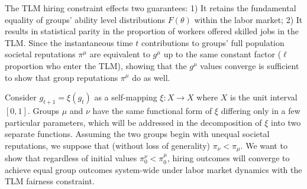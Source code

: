 \documentclass[sigconf]{acmart}
\theoremstyle{definition}
\begin{document}


The TLM hiring constraint effects two guarantees: 1) It retains the fundamental equality of groups' ability level distributions $F(\theta)$ within the labor market; 2) It results in statistical parity in the proportion of workers offered skilled jobs in the TLM. Since the instantaneous time $t$ contributions to groups' full population societal reputations $\pi^\mu$ are equivalent to $g^\mu$ up to the same constant factor ($\ell$ proportion who enter the TLM), showing that the $g^\mu$ values converge is sufficient to show that group reputations $\pi^\mu$ do as well. 

Consider $g_{t+1} = \xi(g_{t})$ as a self-mapping $\xi: X \rightarrow X$ where $X$ is the unit interval $[0,1]$. Groups $\mu$ and $\nu$ have the same functional form of $\xi$ differing only in a few particular parameters, which will be addressed in the decomposition of $\xi$ into two separate functions. Assuming the two groups begin with unequal societal reputations, we suppose that (without loss of generality) $\pi_\nu < \pi_\mu$. We want to show that regardless of initial values $\pi^\nu_0 < \pi^\mu_0$, hiring outcomes will converge to achieve equal group outcomes system-wide under labor market dynamics with the TLM fairness constraint.
\end{document}
